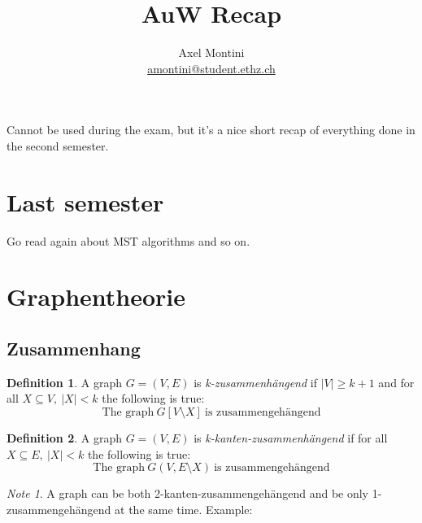\documentclass[12pt]{extarticle}
\title{AuW Recap}
\author{
    Axel Montini
    \\
    \href{mailto:amontini@student.ethz.ch}{amontini@student.ethz.ch}
}
\theoremstyle{definition}
\newtheorem{definition}{Definition}
\theoremstyle{remark}
\newtheorem{note}{Note}
\theoremstyle{plain}
\theoremstyle{plain}
\theoremstyle{plain}
\begin{document}
\maketitle

Cannot be used during the exam, but it's a nice short recap of everything done in the second semester.

\section{Last semester}
Go read again about MST algorithms and so on.

\section{Graphentheorie}

\subsection{Zusammenhang}
\begin{definition}
    A graph $G=(V,E)$ is \textit{k-zusammenhängend} if $|V| \ge k + 1$ and
    for all $X \subseteq V,\ |X| < k$ the following is true:
    \[ \mbox{The graph}\ G[V \setminus X]\ \mbox{is zusammengehängend} \]
\end{definition}

\begin{definition}
    A graph $G=(V,E)$ is \textit{k-kanten-zusammenhängend} if
    for all $X \subseteq E,\ |X| < k$ the following is true:
    \[ \mbox{The graph}\ G(V, E \setminus X)\ \mbox{is zusammengehängend} \]
\end{definition}

\begin{note}
    A graph can be both 2-kanten-zusammengehängend and be only 1-zusammengehängend at the same time.
    Example:
    \begin{figure}[H]
        \centering

    \end{figure}
\end{note}
\end{document}
